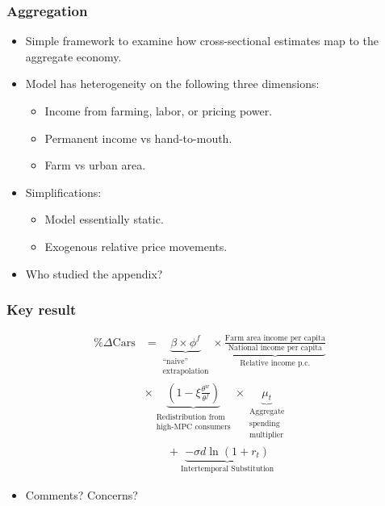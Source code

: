 \documentclass[english,xcolor=svgnames]{beamer}
\begin{document}
\begin{frame}
\frametitle{Aggregation}

\begin{itemize}
\item Simple framework to examine how cross-sectional estimates map to the aggregate economy.
\item Model has heterogeneity on the following three dimensions:
\begin{itemize}
	\item Income from farming, labor, or pricing power.
	\item Permanent income vs hand-to-mouth.
	\item Farm vs urban area.
\end{itemize}
\item Simplifications:
\begin{itemize}
	\item Model essentially static.
	\item Exogenous relative price movements.
\end{itemize}
\item Who studied the appendix?
\end{itemize}

\end{frame}

\begin{frame}
\frametitle{Key result}
\vspace{-0.8cm}
\begin{align*}
	\% \Delta \text{Cars} &= \underbrace{\beta \times
                         \phi^{f}}_{\substack{\text{``naive''} \\
  \text{extrapolation}}} \times  \underbrace{\frac{\text{Farm
  area income per capita}}{\text{National income per
  capita}}}_{\text{Relative income p.c.}} \\
  & \times  \underbrace{\left( 1-\xi\frac{\theta^{w}}{\theta^{f}} \right)}_{\substack{\text{Redistribution from } \\ \text{high-MPC consumers}}} \times \underbrace{\mu_{t}}_{\substack{\text{Aggregate}\\ \text{spending}\\ \text{multiplier}}} \\
  &\qquad  + \underbrace{-\sigma  d\ln (1+r_t)}_{\text{Intertemporal Substitution}}
\end{align*}
\begin{itemize}
	\item Comments? Concerns?
\end{itemize}

\end{frame}
\end{document}
